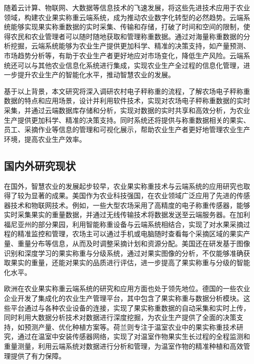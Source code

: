 \documentclass{xduugmr}
\begin{document}
随着云计算、物联网、大数据等信息技术的飞速发展，将这些先进技术应用于农业领域，构建农业果实称重云端系统，成为推动农业数字化转型的必然趋势。云端系统能够实现果实称重数据的实时采集、传输和存储，打破了时间和空间的限制，使得农民和农业管理者可以随时随地获取和管理称重数据\cite{李道亮2012物联网与智慧农业}。通过对海量称重数据的分析挖掘，云端系统能够为农业生产提供更加科学、精准的决策支持，如产量预测、市场趋势分析等，有助于农业生产者更好地应对市场变化，降低生产风险\cite{韩佳伟2022装备与信息协同促进现代智慧农业发展研究}。云端系统还可以与其他农业信息化系统进行集成\cite{刘洋2013基于物联网与云计算服务的农业温室智能化平台研究与应用术}，实现农业生产全过程的信息化管理，进一步提升农业生产的智能化水平，推动智慧农业的发展。

基于以上背景，本文研究将深入调研农村电子秤称重的流程，了解农场电子秤称重数据的特点和应用场景，设计并利用软件技术，实现对农场电子秤称重数据的实时采集，并通过云端数据库存储和分析，实现对数据的实时共享和高效分析，为农业生产提供更加科学、精准的决策支持。同时系统还将提供与称重数据相关的果实、员工、采摘作业等信息的管理和可视化展示，帮助农业生产者更好地管理农业生产环境，提高农业生产效率。

\subsection{国内外研究现状}

在国外，智慧农业的发展起步较早，农业果实称重技术与云端系统的应用研究也取得了较为显著的成果。美国作为农业科技强国，在农业领域广泛应用了先进的传感器技术和物联网技术\cite{赵春江2021智慧农业的发展现状与未来展望}。例如，一些大型农场采用了高精度的电子称重传感器，能够实时采集果实的重量数据，并通过无线传输技术将数据发送至云端服务器\cite{陈学庚2020农业机械与信息技术融合发展现状与方向}。在加利福尼亚州的部分果园，利用智能称重设备与云端系统相结合，实现了对水果采摘过程的精准监控和管理\cite{Ampatzidis2011}，农场主可以通过手机或电脑随时查看每个采摘区域的果实产量、重量分布等信息，从而及时调整采摘计划和资源分配。美国还在研发基于图像识别和深度学习的果实称重与分级系统，通过对果实图像的分析\cite{Anisha2019FruitRU}，不仅能够准确获取果实的重量，还能对果实的品质进行评估，进一步提高了果实称重与分级的智能化水平。

欧洲在农业果实称重云端系统的研究和应用方面也处于领先地位。德国的一些农业企业开发了集成化的农业生产管理平台，其中包含了果实称重与数据分析模块\cite{Yin2020}。这些平台通过与各种农业设备的连接，实现了果实称重数据的自动采集和实时上传，同时利用大数据分析技术对数据进行深度挖掘，为农业生产提供了全面的决策支持，如预测产量、优化种植方案等\cite{Phate2021}。荷兰则专注于温室农业中的果实称重技术研究，通过在温室中安装传感器网络，实现了对温室作物果实生长过程的全程监测和重量测量\cite{Graaf2004}，利用云端系统对数据进行分析和管理，为温室作物的精准种植和高效管理提供了有力保障。
\end{document}
